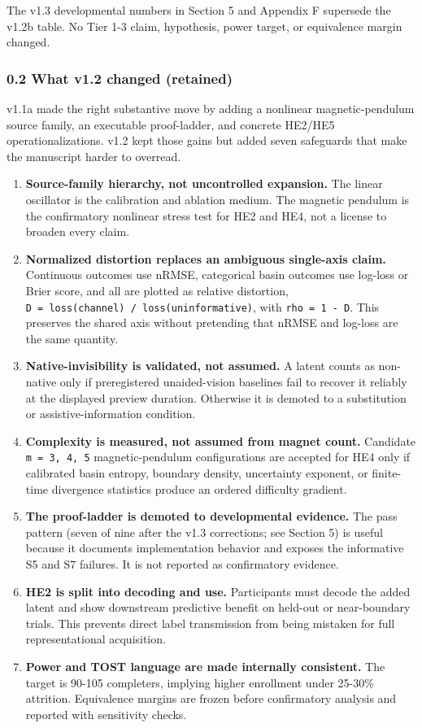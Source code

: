\documentclass[
  11pt,
]{article}
\providecommand{\tightlist}{%
  \setlength{\itemsep}{0pt}\setlength{\parskip}{0pt}}
\begin{document}
The v1.3 developmental numbers in Section 5 and
Appendix F supersede the v1.2b table. No Tier 1-3
claim, hypothesis, power target, or equivalence margin
changed.

\subsubsection{0.2 What v1.2 changed
(retained)}\label{what-v1.2-changed-retained}

v1.1a made the right substantive move by adding a
nonlinear magnetic-pendulum source family, an
executable proof-ladder, and concrete HE2/HE5
operationalizations. v1.2 kept those gains but added
seven safeguards that make the manuscript harder to
overread.

\begin{enumerate}
\def\labelenumi{\arabic{enumi}.}
\tightlist
\item
  \textbf{Source-family hierarchy, not uncontrolled
  expansion.} The linear oscillator is the calibration
  and ablation medium. The magnetic pendulum is the
  confirmatory nonlinear stress test for HE2 and HE4,
  not a license to broaden every claim.
\item
  \textbf{Normalized distortion replaces an ambiguous
  single-axis claim.} Continuous outcomes use nRMSE,
  categorical basin outcomes use log-loss or Brier
  score, and all are plotted as relative distortion,
  \texttt{D\ =\ loss(channel)\ /\ loss(uninformative)},
  with \texttt{rho\ =\ 1\ -\ D}. This preserves the
  shared axis without pretending that nRMSE and
  log-loss are the same quantity.
\item
  \textbf{Native-invisibility is validated, not
  assumed.} A latent counts as non-native only if
  preregistered unaided-vision baselines fail to
  recover it reliably at the displayed preview
  duration. Otherwise it is demoted to a substitution
  or assistive-information condition.
\item
  \textbf{Complexity is measured, not assumed from
  magnet count.} Candidate \texttt{m\ =\ 3,\ 4,\ 5}
  magnetic-pendulum configurations are accepted for HE4
  only if calibrated basin entropy, boundary density,
  uncertainty exponent, or finite-time divergence
  statistics produce an ordered difficulty gradient.
\item
  \textbf{The proof-ladder is demoted to developmental
  evidence.} The pass pattern (seven of nine after the
  v1.3 corrections; see Section 5) is useful because it
  documents implementation behavior and exposes the
  informative S5 and S7 failures. It is not reported as
  confirmatory evidence.
\item
  \textbf{HE2 is split into decoding and use.}
  Participants must decode the added latent and show
  downstream predictive benefit on held-out or
  near-boundary trials. This prevents direct label
  transmission from being mistaken for full
  representational acquisition.
\item
  \textbf{Power and TOST language are made internally
  consistent.} The target is 90-105 completers,
  implying higher enrollment under 25-30\% attrition.
  Equivalence margins are frozen before confirmatory
  analysis and reported with sensitivity checks.
\end{enumerate}
\end{document}
